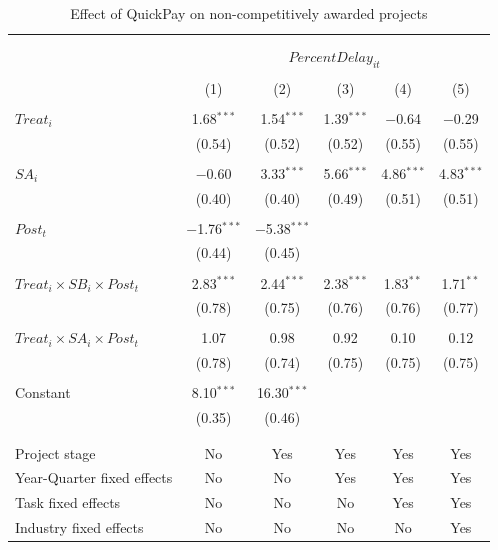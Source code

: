 \documentclass[
]{article}
\begin{document}
\begin{table}[H] \centering 
  \caption{Effect of QuickPay on non-competitively awarded projects} 
  \label{} 
\small 
\begin{tabular}{@{\extracolsep{-2pt}}lccccc} 
\\[-1.8ex]\hline 
\hline \\[-1.8ex] 
\\[-1.8ex] & \multicolumn{5}{c}{$PercentDelay_{it}$  } \\ 
\\[-1.8ex] & (1) & (2) & (3) & (4) & (5)\\ 
\hline \\[-1.8ex] 
 $Treat_i$ & 1.68$^{***}$ & 1.54$^{***}$ & 1.39$^{***}$ & $-$0.64 & $-$0.29 \\ 
  & (0.54) & (0.52) & (0.52) & (0.55) & (0.55) \\ 
  & & & & & \\ 
 $SA_i$ & $-$0.60 & 3.33$^{***}$ & 5.66$^{***}$ & 4.86$^{***}$ & 4.83$^{***}$ \\ 
  & (0.40) & (0.40) & (0.49) & (0.51) & (0.51) \\ 
  & & & & & \\ 
 $Post_t$ & $-$1.76$^{***}$ & $-$5.38$^{***}$ &  &  &  \\ 
  & (0.44) & (0.45) &  &  &  \\ 
  & & & & & \\ 
 $Treat_i \times SB_i \times Post_t$ & 2.83$^{***}$ & 2.44$^{***}$ & 2.38$^{***}$ & 1.83$^{**}$ & 1.71$^{**}$ \\ 
  & (0.78) & (0.75) & (0.76) & (0.76) & (0.77) \\ 
  & & & & & \\ 
 $Treat_i \times SA_i \times Post_t$ & 1.07 & 0.98 & 0.92 & 0.10 & 0.12 \\ 
  & (0.78) & (0.74) & (0.75) & (0.75) & (0.75) \\ 
  & & & & & \\ 
 Constant & 8.10$^{***}$ & 16.30$^{***}$ &  &  &  \\ 
  & (0.35) & (0.46) &  &  &  \\ 
  & & & & & \\ 
\hline \\[-1.8ex] 
Project stage & No & Yes & Yes & Yes & Yes \\ 
Year-Quarter fixed effects & No & No & Yes & Yes & Yes \\ 
Task fixed effects & No & No & No & Yes & Yes \\ 
Industry fixed effects & No & No & No & No & Yes \\ 

\end{tabular}
\end{table}
\end{document}
